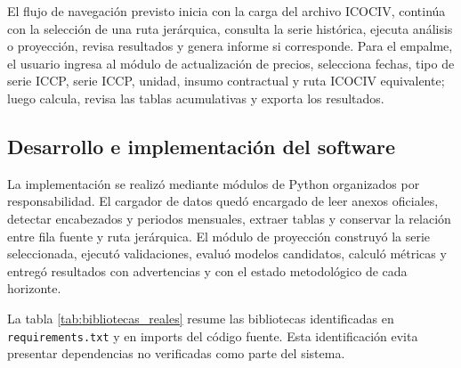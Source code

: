 \documentclass[12pt,letterpaper]{article}
\newcommand{\ICOCIV}{ICOCIV}
\newcommand{\ICCP}{ICCP}
\begin{document}
El flujo de navegación previsto inicia con la carga del archivo \ICOCIV{}, continúa con la selección de una ruta jerárquica, consulta la serie histórica, ejecuta análisis o proyección, revisa resultados y genera informe si corresponde. Para el empalme, el usuario ingresa al módulo de actualización de precios, selecciona fechas, tipo de serie \ICCP, serie \ICCP, unidad, insumo contractual y ruta \ICOCIV{} equivalente; luego calcula, revisa las tablas acumulativas y exporta los resultados.

\subsection{Desarrollo e implementación del software}

La implementación se realizó mediante módulos de Python organizados por responsabilidad. El cargador de datos quedó encargado de leer anexos oficiales, detectar encabezados y periodos mensuales, extraer tablas y conservar la relación entre fila fuente y ruta jerárquica. El módulo de proyección construyó la serie seleccionada, ejecutó validaciones, evaluó modelos candidatos, calculó métricas y entregó resultados con advertencias y con el estado metodológico de cada horizonte.

La tabla \ref{tab:bibliotecas_reales} resume las bibliotecas identificadas en \texttt{requirements.txt} y en imports del código fuente. Esta identificación evita presentar dependencias no verificadas como parte del sistema.
\end{document}
